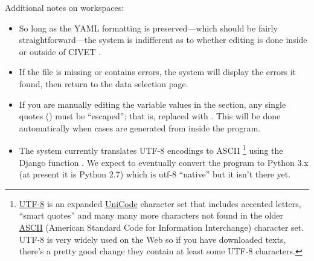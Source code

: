 \documentclass[letterpaper,10pt,english]{sphinxmanual}
\begin{document}
Additional notes on workspaces:
\begin{itemize}
\item {} 
So long as the YAML formatting is preserved—which should be fairly
straightforward—the system is indifferent as to whether editing is
done inside or outside of CIVET .

\item {} 
If the  file is missing or contains errors, the system will
display the errors it found, then return to the data selection page.

\item {} 
If you are manually editing the variable values in the 
section, any single quotes () must be “escaped”; that is,
replaced with . This will be done automatically when cases are
generated from inside the program.

\item {} 
The system currently translates UTF-8 encodings to ASCII \footnote{
\href{https://en.wikipedia.org/wiki/UTF-8}{UTF-8} is an expanded
\href{https://en.wikipedia.org/wiki/Unicode}{UniCode} character set that includes
accented letters, “smart quotes”
and many many more characters not found in the older
\href{https://en.wikipedia.org/wiki/ASCII}{ASCII} (American Standard Code for
Information Interchange) character set. UTF-8 is very widely used on the
Web so if you have downloaded texts, there's a pretty good change they
contain at least some UTF-8 characters.
} using the
Django function . We expect to eventually
convert the program to Python 3.x (at present it is Python 2.7) which
is utf-8 “native” but it isn't there yet.

\end{itemize}
\end{document}
